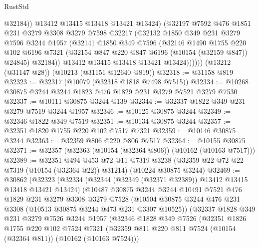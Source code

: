 \begin{lexlean}{RustStd}
\begin{coremodule}
                  @32184))
              @13412
              @13415
              @13418
              @13421
              @13424)
            (@32197
              @7592
              @476
              @1851
              @231
              @3279
              @3308
              @3279
              @7598
              @32217
              (@32132
                @1850
                @349
                @231
                @3279
                @7596
                @3244
                @1957
                (@32141
                  @1850
                  @349
                  @7596
                  (@32146
                    @1490
                    @1755
                    @220
                    @102
                    @6196
                    @7321
                    (@32154 @847 @220 @847 @6196 (@10154 (@32159 @847)) @24845)
                    @32184))
                @13412
                @13415
                @13418
                @13421
                @13424))))))
    (@13212 (@31147 @28))
    (@10213 (@31151 @12640 @819))
@32318 := @31158 @819
@32323 := @32317 (@10079 (@32318 @1818 @7498 @7515))
@32334 := @10268 @30875 @3244 @3244 @1823 @476 @1829 @231 @3279 @7521 @3279 @7530
@32337 := @10111 @30875 @3244 @139
@32344 := @32337 @1822 @349 @231 @3279 @7519 @3244 @1957
@32346 := @10125 @30875 @3244
@32349 := @32346 @1822 @349 @7519
@32351 := @10134 @30875 @3244
@32357 := @32351 @1820 @1755 @220 @102 @7517 @7321
@32359 := @10146 @30875 @3244
@32363 := @32359 @806 @220 @806 @7517
@32364 := @10155 @30875
@32371 := @32357 (@32363 (@10154 (@32364 @806)) (@10162 (@10163 @7517)))
@32389 := @32351
    @494
    @453
    @72
    @11
    @7319
    @3238
    (@32359 @22 @72 @22 @7319 (@10154 (@32364 @22)) @31214)
    (@10224 @30875 @3244)
@32469 := @30862
    (@32323
      (@32334
        (@32344 (@32349 (@32371 @32389)) @13412 @13415 @13418 @13421 @13424)
        (@10487
          @30875
          @3244
          @3244
          @10491
          @7521
          @476
          @1829
          @231
          @3279
          @3308
          @3279
          @7528
          (@10504 @30875 @3244 @476 @231 @3308 (@10513 @30875 @3244 @473 @231 @3307 @10525))
          (@32337
            @1828
            @349
            @231
            @3279
            @7526
            @3244
            @1957
            (@32346
              @1828
              @349
              @7526
              (@32351
                @1826
                @1755
                @220
                @102
                @7524
                @7321
                (@32359 @811 @220 @811 @7524 (@10154 (@32364 @811)) (@10162 (@10163 @7524)))

\end{coremodule}
\end{lexlean}
